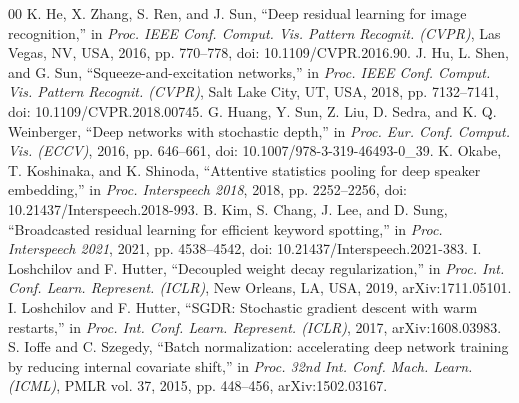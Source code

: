 \documentclass[conference]{IEEEtran}
\begin{document}
\begin{thebibliography}{00}
 K. He, X. Zhang, S. Ren, and J. Sun, ``Deep residual learning for image recognition,'' in \textit{Proc. IEEE Conf. Comput. Vis. Pattern Recognit. (CVPR)}, Las Vegas, NV, USA, 2016, pp. 770--778, doi: 10.1109/CVPR.2016.90.
 J. Hu, L. Shen, and G. Sun, ``Squeeze-and-excitation networks,'' in \textit{Proc. IEEE Conf. Comput. Vis. Pattern Recognit. (CVPR)}, Salt Lake City, UT, USA, 2018, pp. 7132--7141, doi: 10.1109/CVPR.2018.00745.
 G. Huang, Y. Sun, Z. Liu, D. Sedra, and K. Q. Weinberger, ``Deep networks with stochastic depth,'' in \textit{Proc. Eur. Conf. Comput. Vis. (ECCV)}, 2016, pp. 646--661, doi: 10.1007/978-3-319-46493-0\_39.
 K. Okabe, T. Koshinaka, and K. Shinoda, ``Attentive statistics pooling for deep speaker embedding,'' in \textit{Proc. Interspeech 2018}, 2018, pp. 2252--2256, doi: 10.21437/Interspeech.2018-993.
 B. Kim, S. Chang, J. Lee, and D. Sung, ``Broadcasted residual learning for efficient keyword spotting,'' in \textit{Proc. Interspeech 2021}, 2021, pp. 4538--4542, doi: 10.21437/Interspeech.2021-383.
 I. Loshchilov and F. Hutter, ``Decoupled weight decay regularization,'' in \textit{Proc. Int. Conf. Learn. Represent. (ICLR)}, New Orleans, LA, USA, 2019, arXiv:1711.05101.
 I. Loshchilov and F. Hutter, ``SGDR: Stochastic gradient descent with warm restarts,'' in \textit{Proc. Int. Conf. Learn. Represent. (ICLR)}, 2017, arXiv:1608.03983.
 S. Ioffe and C. Szegedy, ``Batch normalization: accelerating deep network training by reducing internal covariate shift,'' in \textit{Proc. 32nd Int. Conf. Mach. Learn. (ICML)}, PMLR vol. 37, 2015, pp. 448--456, arXiv:1502.03167.
\end{thebibliography}
\end{document}
